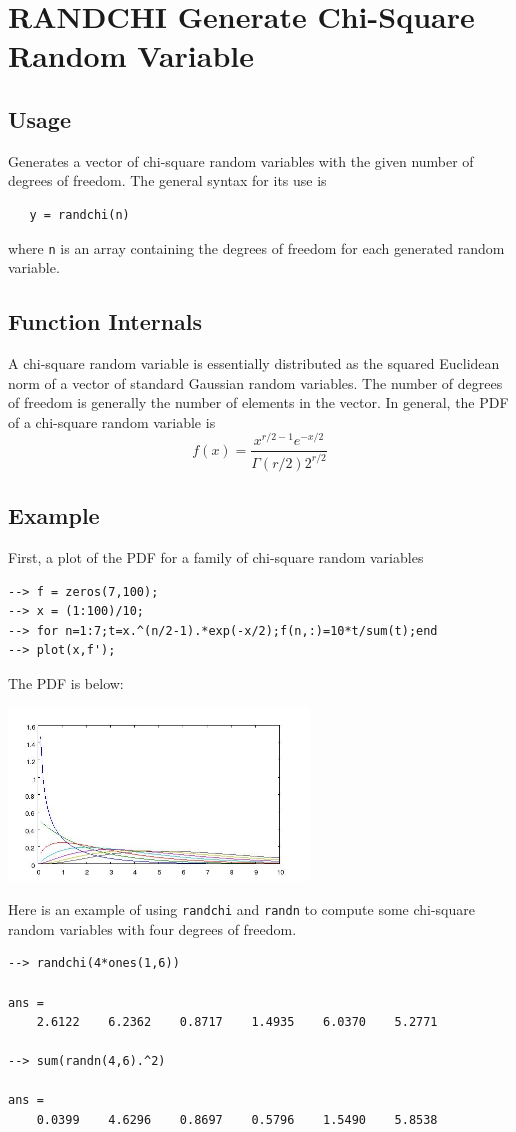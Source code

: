 \section{RANDCHI Generate Chi-Square Random Variable}

\subsection{Usage}

Generates a vector of chi-square random variables with the
given number of degrees of freedom.  The general syntax for
its use is 
\begin{verbatim}
   y = randchi(n)
\end{verbatim}
where \verb|n| is an array containing the degrees of freedom for
each generated random variable.
\subsection{Function Internals}

A chi-square random variable is essentially distributed as
the squared Euclidean norm of a vector of standard Gaussian random 
variables.  The number of degrees of freedom is generally the
number of elements in the vector.  In general, the PDF of
a chi-square random variable is
\[
 f(x) = \frac{x^{r/2-1}e^{-x/2}}{\Gamma(r/2)2^{r/2}}
\]
\subsection{Example}

First, a plot of the PDF for a family of chi-square random variables
\begin{verbatim}
--> f = zeros(7,100);
--> x = (1:100)/10;
--> for n=1:7;t=x.^(n/2-1).*exp(-x/2);f(n,:)=10*t/sum(t);end
--> plot(x,f');
\end{verbatim}
The PDF is below:


\centerline{\includegraphics[width=8cm]{chipdf}}

Here is an example of using \verb|randchi| and \verb|randn| to compute
some chi-square random variables with four degrees of freedom.
\begin{verbatim}
--> randchi(4*ones(1,6))

ans = 
    2.6122    6.2362    0.8717    1.4935    6.0370    5.2771 

--> sum(randn(4,6).^2)

ans = 
    0.0399    4.6296    0.8697    0.5796    1.5490    5.8538 
\end{verbatim}
